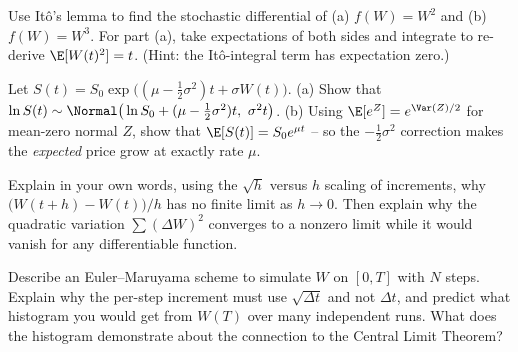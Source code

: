 \begin{exercise}
Use It\^o's lemma to find the stochastic differential of (a) $f(W)=W^2$ and
(b) $f(W)=W^3$. For part (a), take expectations of both sides and integrate to
re-derive $\E[W(t)^2]=t$. (Hint: the It\^o-integral term has expectation zero.)
\end{exercise}

\begin{exercise}
Let $S(t)=S_0\exp\big((\mu-\tfrac12\sigma^2)t+\sigma W(t)\big)$. (a) Show that
$\ln S(t)\sim\Normal\big(\ln S_0 + (\mu-\tfrac12\sigma^2)t,\ \sigma^2 t\big)$.
(b) Using $\E[e^{Z}] = e^{\Var(Z)/2}$ for mean-zero normal $Z$, show that
$\E[S(t)] = S_0 e^{\mu t}$ -- so the $-\tfrac12\sigma^2$ correction makes the
\emph{expected} price grow at exactly rate $\mu$.
\end{exercise}

\begin{exercise}
Explain in your own words, using the $\sqrt h$ versus $h$ scaling of increments,
why $\big(W(t+h)-W(t)\big)/h$ has no finite limit as $h\to0$. Then explain why the
quadratic variation $\sum (\Delta W)^2$ converges to a nonzero limit while it
would vanish for any differentiable function.
\end{exercise}

\begin{exercise}
Describe an Euler--Maruyama scheme to simulate $W$ on $[0,T]$ with $N$ steps.
Explain why the per-step increment must use $\sqrt{\Delta t}$ and not $\Delta t$,
and predict what histogram you would get from $W(T)$ over many independent runs.
What does the histogram demonstrate about the connection to the Central Limit
Theorem?
\end{exercise}
